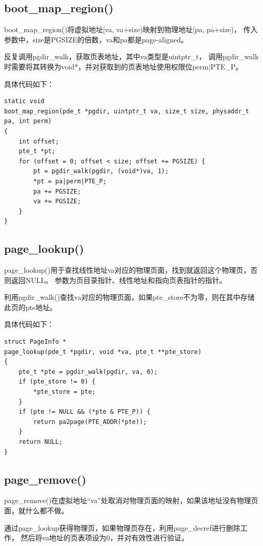 \documentclass[12pt,a4paper,UTF8]{article}
\begin{document}
    \subsection{boot\_map\_region()}

    boot\_map\_region()将虚拟地址[va, va+size)映射到物理地址[pa, pa+size)，
    传入参数中，size是PGSIZE的倍数，va和pa都是page-aligned。
    
    反复调用pgdir\_walk，获取页表地址，其中va类型是uintptr\_t，
    调用pgdir\_walk时需要将其转换为void*，并对获取到的页表地址使用权限位perm$|$PTE\_P。

    具体代码如下：
    \begin{lstlisting}[style=CPP]
static void
boot_map_region(pde_t *pgdir, uintptr_t va, size_t size, physaddr_t pa, int perm)
{
	int offset;
    pte_t *pt;
    for (offset = 0; offset < size; offset += PGSIZE) {
        pt = pgdir_walk(pgdir, (void*)va, 1);
        *pt = pa|perm|PTE_P;
        pa += PGSIZE;
        va += PGSIZE;
   	}
}
    \end{lstlisting}

    \subsection{page\_lookup()}

    page\_lookup()用于查找线性地址va对应的物理页面，找到就返回这个物理页，否则返回NULL。
    参数为页目录指针、线性地址和指向页表指针的指针。

    利用pgdir\_walk()查找va对应的物理页面，如果pte\_store不为零，则在其中存储此页的pte地址。

    具体代码如下：
    \begin{lstlisting}[style=CPP]
struct PageInfo *
page_lookup(pde_t *pgdir, void *va, pte_t **pte_store)
{
	pte_t *pte = pgdir_walk(pgdir, va, 0);
   	if (pte_store != 0) {
        *pte_store = pte;
   	}
   	if (pte != NULL && (*pte & PTE_P)) {
      	return pa2page(PTE_ADDR(*pte));
   	}
	return NULL;
}
    \end{lstlisting}

    \subsection{page\_remove()}

    page\_remove()在虚拟地址“va”处取消对物理页面的映射，如果该地址没有物理页面，就什么都不做。
    
    通过page\_lookup获得物理页，如果物理页存在，利用page\_decref进行删除工作，
    然后将va地址的页表项设为0，并对有效性进行验证。
    
\end{document}

